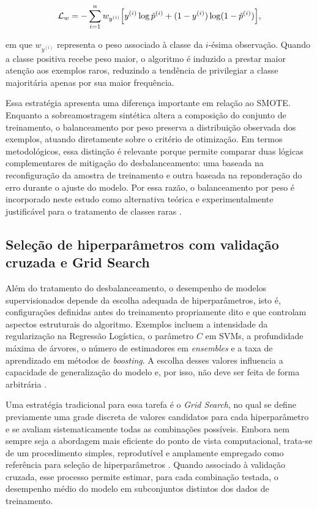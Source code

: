 \begin{equation}
\mathcal{L}_w
= - \sum_{i=1}^n w_{y^{(i)}} \Bigl[ y^{(i)} \log \hat{p}^{(i)}
+ (1-y^{(i)}) \log(1-\hat{p}^{(i)}) \Bigr],
\end{equation}

em que $w_{y^{(i)}}$ representa o peso associado à classe da $i$-ésima observação. Quando a classe positiva recebe peso maior, o algoritmo é induzido a prestar maior atenção aos exemplos raros, reduzindo a tendência de privilegiar a classe majoritária apenas por sua maior frequência.

Essa estratégia apresenta uma diferença importante em relação ao SMOTE. Enquanto a sobreamostragem sintética altera a composição do conjunto de treinamento, o balanceamento por peso preserva a distribuição observada dos exemplos, atuando diretamente sobre o critério de otimização. Em termos metodológicos, essa distinção é relevante porque permite comparar duas lógicas complementares de mitigação do desbalanceamento: uma baseada na reconfiguração da amostra de treinamento e outra baseada na reponderação do erro durante o ajuste do modelo. Por essa razão, o balanceamento por peso é incorporado neste estudo como alternativa teórica e experimentalmente justificável para o tratamento de classes raras \cite{ling2011costsensitive}.

\subsection{Seleção de hiperparâmetros com validação cruzada e Grid Search}

Além do tratamento do desbalanceamento, o desempenho de modelos supervisionados depende da escolha adequada de hiperparâmetros, isto é, configurações definidas antes do treinamento propriamente dito e que controlam aspectos estruturais do algoritmo. Exemplos incluem a intensidade da regularização na Regressão Logística, o parâmetro $C$ em SVMs, a profundidade máxima de árvores, o número de estimadores em \textit{ensembles} e a taxa de aprendizado em métodos de \textit{boosting}. A escolha desses valores influencia a capacidade de generalização do modelo e, por isso, não deve ser feita de forma arbitrária \cite{bergstra2012random}.

Uma estratégia tradicional para essa tarefa é o \textit{Grid Search}, no qual se define previamente uma grade discreta de valores candidatos para cada hiperparâmetro e se avaliam sistematicamente todas as combinações possíveis. Embora nem sempre seja a abordagem mais eficiente do ponto de vista computacional, trata-se de um procedimento simples, reprodutível e amplamente empregado como referência para seleção de hiperparâmetros \cite{bergstra2012random}. Quando associado à validação cruzada, esse processo permite estimar, para cada combinação testada, o desempenho médio do modelo em subconjuntos distintos dos dados de treinamento.

